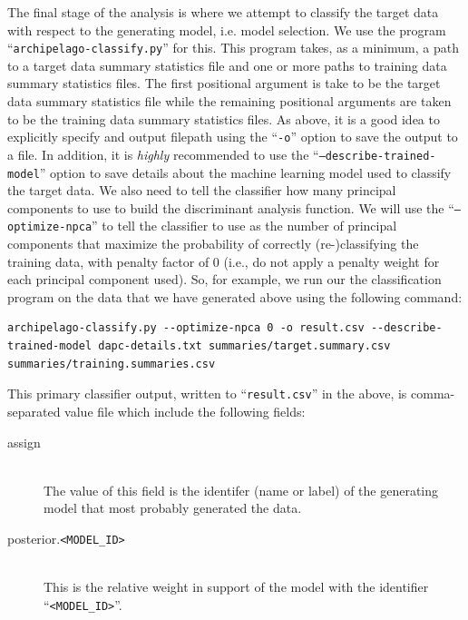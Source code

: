\documentclass[11pt,openany]{memoir} %
\begin{document}
The final stage of the analysis is where we attempt to classify the target data with respect to the generating model, i.e. model selection.
We use the program ``\texttt{archipelago-classify.py}'' for this.
This program takes, as a minimum, a path to a target data summary statistics file and one or more paths to training data summary statistics files.
The first positional argument is take to be the target data summary statistics file while the remaining positional arguments are taken to be the training data summary statistics files.
As above, it is a good idea to explicitly specify and output filepath using the ``\texttt{-o}'' option to save the output to a file.
In addition, it is \textit{highly} recommended to use the ``\texttt{--describe-trained-model}'' option to save details about the machine learning model used to classify the target data.
We also need to tell the classifier how many principal components to use to build the discriminant analysis function.
We will use the ``\texttt{--optimize-npca}'' to tell the classifier to use as the number of principal components that maximize the probability of correctly (re-)classifying the training data, with  penalty factor of $0$ (i.e., do not apply a penalty weight for each principal component used).
So, for example, we run our the classification program on the data that we have generated above using the following command:
\begin{lstlisting}
archipelago-classify.py --optimize-npca 0 -o result.csv --describe-trained-model dapc-details.txt summaries/target.summary.csv summaries/training.summaries.csv
\end{lstlisting}
This primary classifier output, written to ``\texttt{result.csv}'' in the above, is comma-separated value file which include the following fields:
\begin{description}
    \item[assign] \hfill \\
        The value of this field is the identifer (name or label) of the generating model that most probably generated the data.
    \item[posterior.\texttt{<MODEL\_ID>}] \hfill \\
        This is the relative weight in support of the model with the identifier ``\texttt{<MODEL\_ID>}''.
\end{description}
\end{document}
